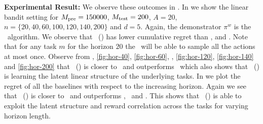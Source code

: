 \documentclass[10pt]{article}
\theoremstyle{plain}
\theoremstyle{definition}
\theoremstyle{remark}
\begin{document}
\textbf{Experimental Result:} We observe these outcomes in . In  we show the linear bandit setting for $M_{\text{pre}} =  150000$, $M_{\text{test}} = 200$, $A=20$, $n=\{20, 40, 60, 100, 120, 140, 200\}$ and $d=5$.
Again, the demonstrator $\pi^w$ is the \ts\ algorithm. We observe that \pred\ (\gt) has lower cumulative regret than \dptg, and \ad. Note that for any task $m$ for the horizon $20$ the \ts\ will be able to sample all the actions at most once.
Observe from , \ref{fig:hor-40}, \ref{fig:hor-60}, , \ref{fig:hor-120}, \ref{fig:hor-140} and \ref{fig:hor-200} that \pred\ (\gt) is closer to \linucb\ and outperforms \ts\ which also shows that \pred\ (\gt) is learning the latent linear structure of the underlying tasks.
In  we plot the regret of all the baselines with respect to the increasing horizon. Again we see that \pred\ (\gt) is closer to \linucb\ and outperforms \dptg, \ad\ and \ts.
This shows that \pred\ (\gt) is able to exploit the latent structure and reward correlation across the tasks for varying horizon length.
\end{document}
